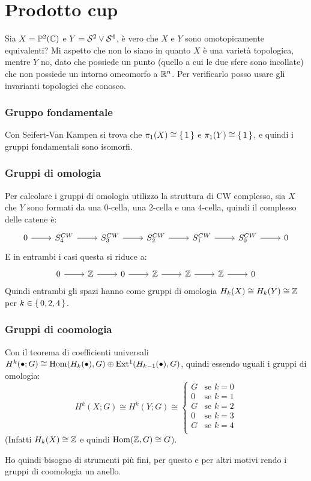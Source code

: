 
\section{Prodotto cup}

\begin{example}
  Sia $ X = \mathbb{P}^{2} (\mathbb{C}) $ e $ Y = \mathcal{S}^{2} \vee \mathcal{S}^{4} $, è vero che $ X $ e $ Y $ sono
  omotopicamente equivalenti? Mi aspetto che non lo siano in quanto $ X $ è una
  varietà topologica, mentre $ Y $ no, dato che possiede un punto (quello a cui
  le due sfere sono incollate) che non possiede un intorno omeomorfo a
  $ \mathbb{R}^{n} $. Per verificarlo posso usare gli invarianti topologici che
  conosco.
  \subsubsection{Gruppo fondamentale}
  Con Seifert-Van Kampen si trova che $ \pi_1(X) \cong \set{1} $ e
  $ \pi_1(Y) \cong \set{1} $, e quindi i gruppi fondamentali sono isomorfi.
  \subsubsection{Gruppi di omologia}
  Per calcolare i gruppi di omologia utilizzo la struttura di CW complesso,
  sia $ X $ che $ Y $ sono formati da una $ 0 $-cella, una $ 2 $-cella e una
  $ 4 $-cella, quindi il complesso delle catene è:
  \[
    \begin{tikzcd}
      0 \rar & S_4^{CW} \rar & S_3^{CW} \rar & S_2^{CW} \rar & S_1^{CW} \rar & S_0^{CW} \rar & 0
    \end{tikzcd}
  \]
  E in entrambi i casi questa si riduce a:
  \[
    \begin{tikzcd}
      0 \rar & \Z \rar & 0 \rar & \Z \rar & \Z \rar & \Z \rar & 0
    \end{tikzcd}
  \]
  Quindi entrambi gli spazi hanno come gruppi di omologia
  $ H_k(X) \cong H_k(Y) \cong \mathbb{Z} $ per $ k \in \set{0,2,4} $.
  \subsubsection{Gruppi di coomologia}
  Con il teorema di coefficienti universali $ H^k(\bullet;G) \cong \mathrm{Hom}( H_k(\bullet), G) \oplus \mathrm{Ext^1}( H_{k-1}(\bullet), G) $,
  quindi essendo uguali i gruppi di omologia:
  \[
    H^k(X;G) \cong H^k(Y;G) \cong
    \begin{cases}
      G & \text{se } k = 0 \\
      0 & \text{se } k = 1 \\
      G & \text{se } k = 2 \\
      0 & \text{se } k = 3 \\
      G & \text{se } k = 4 \\
    \end{cases}
  \]
  (Infatti $ H_k(X) \cong \mathbb{Z} $ e quindi $ \mathrm{Hom}( \mathbb{Z}, G) \cong G $).

  Ho quindi bisogno di strumenti più fini, per questo e per altri motivi rendo i
  gruppi di coomologia un anello.

\end{example}

